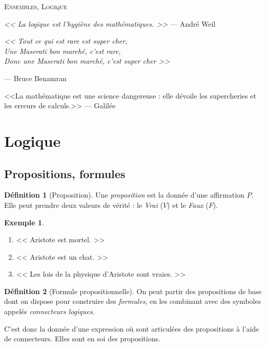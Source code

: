 \documentclass[11pt]{article}
\theoremstyle{definition}
\newtheorem{defn}{Définition}[section]
\newtheorem{exe}{Exemple}
\theoremstyle{remark}
\begin{document}
\begin{center}
	\textsc{\LARGE Ensembles, Logique}
\end{center}
\vspace{1cm}

\begin{flushright}
\textit{<< La logique est l'hygiène des mathématiques. >>} — André Weil\end{flushright}

\begin{flushright}
\begin{flushleft}
\textit{<< Tout ce qui est rare est super cher,\\
    Une Maserati bon marché, c'est rare,\\
    Donc une Maserati bon marché, c'est super cher >>}
\end{flushleft}
— Bruce Benamran
\end{flushright}

\begin{flushright}
<<La mathématique est une science dangereuse : elle dévoile les supercheries et les erreurs de calculs.>> — Galilée
\end{flushright}

\section{Logique}

\subsection{Propositions, formules}

\begin{defn}[Proposition]
Une \textit{proposition} est la donnée d'une affirmation $P$. Elle peut prendre deux valeurs de vérité : le \textit{Vrai} ($V$) et le \textit{Faux} ($F$).
\end{defn}

\begin{exe}\leavevmode
\begin{enumerate}
\item << Aristote est mortel. >>
\item << Aristote est un chat. >>
\item << Les lois de la physique d'Aristote sont vraies. >>
\end{enumerate}
\end{exe}

\begin{defn}[Formule propositionnelle]
On peut partir des propositions de base dont on dispose pour construire des \textit{formules}, en les combinant avec des symboles appelés \textit{connecteurs logiques}.

C'est donc la donnée d'une expression où sont articulées des propositions à l'aide de connecteurs. Elles sont en soi des propositions.
\end{defn}
\end{document}
